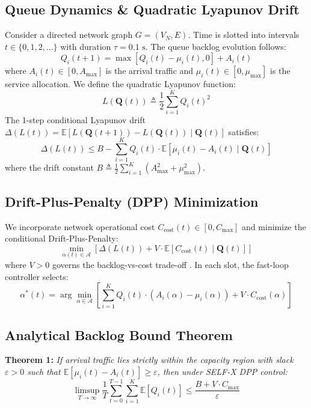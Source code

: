 \documentclass[conference]{IEEEtran}
\begin{document}
\subsection{Queue Dynamics \& Quadratic Lyapunov Drift}
Consider a directed network graph $G = (V_N, E)$. Time is slotted into intervals $t \in \{0, 1, 2, \dots\}$ with duration $\tau = 0.1\text{ s}$. The queue backlog evolution follows:
\begin{equation}
Q_i(t+1) = \max\left[ Q_i(t) - \mu_i(t), 0 \right] + A_i(t)
\end{equation}
where $A_i(t) \in [0, A_{\max}]$ is the arrival traffic and $\mu_i(t) \in [0, \mu_{\max}]$ is the service allocation. We define the quadratic Lyapunov function:
\begin{equation}
L(\mathbf{Q}(t)) \triangleq \frac{1}{2} \sum_{i=1}^{K} Q_i(t)^2
\end{equation}
The 1-step conditional Lyapunov drift $\Delta(L(t)) = \mathbb{E}[L(\mathbf{Q}(t+1)) - L(\mathbf{Q}(t)) \mid \mathbf{Q}(t)]$ satisfies:
\begin{equation}
\Delta(L(t)) \le B - \sum_{i=1}^{K} Q_i(t) \cdot \mathbb{E}\left[ \mu_i(t) - A_i(t) \mid \mathbf{Q}(t) \right]
\end{equation}
where the drift constant $B \triangleq \frac{1}{2} \sum_{i=1}^{K} (A_{\max}^2 + \mu_{\max}^2)$.

\subsection{Drift-Plus-Penalty (DPP) Minimization}
We incorporate network operational cost $C_{\text{cost}}(t) \in [0, C_{\max}]$ and minimize the conditional Drift-Plus-Penalty:
\begin{equation}
\min_{\alpha(t) \in \mathcal{A}} \left[ \Delta(L(t)) + V \cdot \mathbb{E}\left[ C_{\text{cost}}(t) \mid \mathbf{Q}(t) \right] \right]
\end{equation}
where $V > 0$ governs the backlog-vs-cost trade-off \cite{neely2010stochastic}. In each slot, the fast-loop controller selects:
\begin{equation}
\alpha^*(t) = \arg\min_{\alpha \in \mathcal{A}} \left[ \sum_{i=1}^{K} Q_i(t) \cdot (A_i(\alpha) - \mu_i(\alpha)) + V \cdot C_{\text{cost}}(\alpha) \right]
\end{equation}

\subsection{Analytical Backlog Bound Theorem}
\textbf{Theorem 1:} \textit{If arrival traffic lies strictly within the capacity region with slack $\varepsilon > 0$ such that $\mathbb{E}[\mu_i(t) - A_i(t)] \ge \varepsilon$, then under SELF-X DPP control:}
\begin{equation}
\limsup_{T \to \infty} \frac{1}{T} \sum_{t=0}^{T-1} \sum_{i=1}^{K} \mathbb{E}[Q_i(t)] \le \frac{B + V \cdot C_{\max}}{\varepsilon}
\end{equation}
\end{document}
